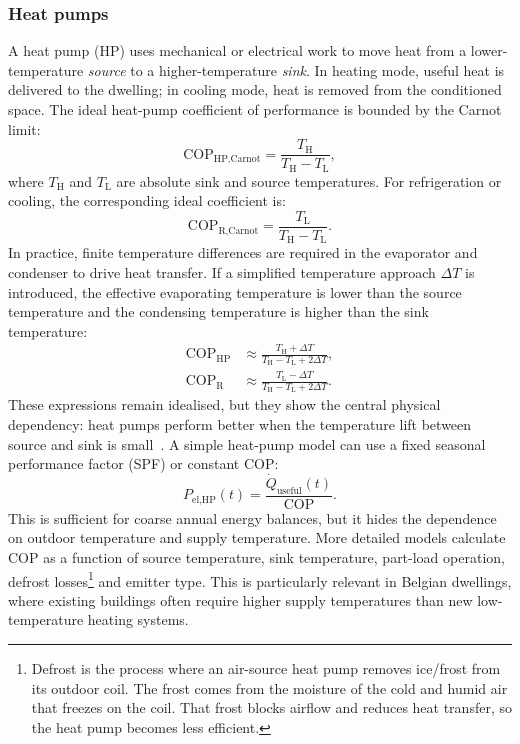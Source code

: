 \subsubsection*{Heat pumps}
A heat pump (HP) uses mechanical or electrical work to move heat from a lower-temperature \textit{source} to a higher-temperature \textit{sink}. In heating mode, useful heat is delivered to the dwelling; in cooling mode, heat is removed from the conditioned space. The ideal heat-pump coefficient of performance is bounded by the Carnot limit:
\begin{equation}
    \text{COP}_{\text{HP,Carnot}}
    =
    \frac{T_\text{H}}{T_\text{H}-T_\text{L}},
\end{equation}
where $T_\text{H}$ and $T_\text{L}$ are absolute sink and source temperatures. For refrigeration or cooling, the corresponding ideal coefficient is:
\begin{equation}
    \text{COP}_{\text{R,Carnot}}
    =
    \frac{T_\text{L}}{T_\text{H}-T_\text{L}}.
\end{equation}
In practice, finite temperature differences are required in the evaporator and condenser to drive heat transfer. If a simplified temperature approach $\Delta T$ is introduced, the effective evaporating temperature is lower than the source temperature and the condensing temperature is higher than the sink temperature:
\begin{align}
    \text{COP}_\text{HP}
    &\approx
    \frac{T_\text{H} + \Delta T}
    {T_\text{H} - T_\text{L} + 2\Delta T}, \\
    \text{COP}_\text{R}
    &\approx
    \frac{T_\text{L} - \Delta T}
    {T_\text{H} - T_\text{L} + 2\Delta T}.
\end{align}
These expressions remain idealised, but they show the central physical dependency: heat pumps perform better when the temperature lift between source and sink is small~\cite{moran2018_thermodynamics,staffell2012_review_heat_pumps}.
\newline A simple heat-pump model can use a fixed seasonal performance factor (SPF) or constant COP:
\begin{equation}
    P_\text{el,HP}(t) =
    \frac{\dot{Q}_\text{useful}(t)}{\text{COP}}.
\end{equation}
This is sufficient for coarse annual energy balances, but it hides the dependence on outdoor temperature and supply temperature. More detailed models calculate COP as a function of source temperature, sink temperature, part-load operation, defrost losses\footnote{Defrost is the process where an air-source heat pump removes ice/frost from its outdoor coil. The frost comes from the moisture of the cold and humid air that freezes on the coil. That frost blocks airflow and reduces heat transfer, so the heat pump becomes less efficient.} and emitter type. This is particularly relevant in Belgian dwellings, where existing buildings often require higher supply temperatures than new low-temperature heating systems.

